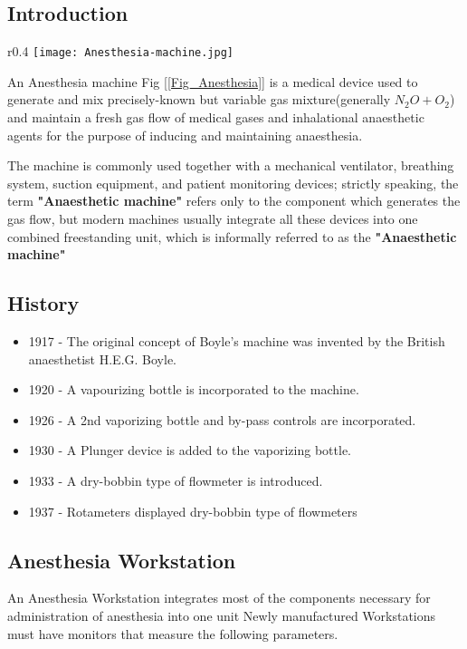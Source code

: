 \documentclass[12pt]{article}
\begin{document}
 \subsection{Introduction}
 \begin{wrapfigure}{r}{0.4\textwidth}
	\hspace{-20pt}
    \texttt{[image: Anesthesia-machine.jpg]}
    \caption{Anesthesia Machine}
    \label{Fig_Anesthesia}
\end{wrapfigure}
 
An Anesthesia machine Fig [\ref{Fig_Anesthesia}] is a medical device used to generate and mix precisely-known but variable gas mixture(generally $N_{2}O+O_{2}$) and maintain  a fresh gas flow of medical gases and inhalational anaesthetic agents for the purpose of inducing and maintaining anaesthesia.\cite{wiki:Anaesthetic_machine}

The machine is commonly used together with a mechanical ventilator, breathing system, suction equipment, and patient monitoring devices; strictly speaking, the term \textbf{"Anaesthetic machine"} refers only to the component which generates the gas flow, but modern machines usually integrate all these devices into one combined freestanding unit, which is informally referred to as the \textbf{"Anaesthetic machine"}

 \subsection{History}
\small
 \begin{itemize}
 \item[\ding{112}] 1917 - The original concept of Boyle's machine was invented by the British anaesthetist H.E.G. Boyle.
  \item[\ding{112}] 1920 - A vapourizing bottle is incorporated to the machine.
  \item[\ding{112}] 1926 - A 2nd vaporizing bottle and by-pass controls are incorporated.
  \item[\ding{112}] 1930 - A Plunger device is added to the vaporizing bottle.
  \item[\ding{112}] 1933 - A dry-bobbin type of flowmeter is introduced. \item[\ding{112}] 1937 - Rotameters displayed dry-bobbin type of flowmeters
 \end{itemize}
\normalsize
 \subsection{Anesthesia Workstation}
  An Anesthesia Workstation \cite{vineet:Anaesthesia_machine} integrates most of the components necessary for administration of anesthesia into one unit
 Newly manufactured Workstations must have monitors that measure the following parameters.
 
\end{document}
